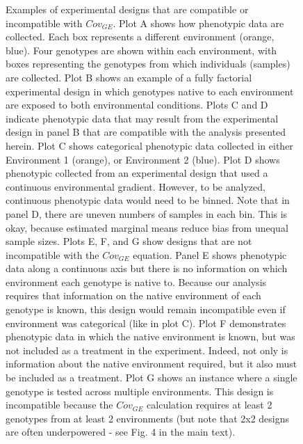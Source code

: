 \documentclass[11pt, oneside]{amsart}
\begin{document}
\begin{figure}[h]
\caption[Examples of experimental designs that are compatible or incompatible with $Cov_{GE}$.]{Examples of experimental designs that are compatible or incompatible with $Cov_{GE}$. Plot A shows how phenotypic data are collected. Each box represents a different environment (orange, blue). Four genotypes are shown within each environment, with boxes representing the genotypes from which individuals (samples) are collected. Plot B shows an example of a fully factorial experimental design in which genotypes native to each environment are exposed to both environmental conditions. Plots C and D indicate phenotypic data that may result from the experimental design in panel B that are compatible with the analysis presented herein. Plot C shows categorical phenotypic data collected in either Environment 1 (orange), or Environment 2 (blue). Plot D shows phenotypic collected from an experimental design that used a continuous environmental gradient. However, to be analyzed, continuous phenotypic data would need to be binned. Note that in panel D, there are uneven numbers of samples in each bin. This is okay, because estimated marginal means reduce bias from unequal sample sizes. Plots E, F, and G show designs that are not incompatible with the $Cov_{GE}$ equation. Panel E shows phenotypic data along a continuous axis but there is no information on which environment each genotype is native to. Because our analysis requires that information on the native environment of each genotype is known, this design would remain incompatible even if environment was categorical (like in plot C). Plot F demonstrates phenotypic data in which the native environment is known, but was not included as a treatment in the experiment. Indeed, not only is information about the native environment required, but it also must be included as a treatment. Plot G shows an instance where a single genotype is tested across multiple environments. This design is incompatible because the $Cov_{GE}$ calculation requires at least 2 genotypes from at least 2 environments (but note that 2x2 designs are often underpowered - see Fig. 4 in the main text). }
\end{figure}

\clearpage
\newpage
\end{document}

